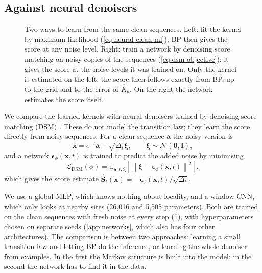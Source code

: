 \subsection{Against neural denoisers}
\label{sec:neural-denoisers}

\begin{figure}[t]
  \centering
  
  \caption{Two ways to learn from the same clean sequences. Left: fit the kernel by maximum likelihood
  (\cref{eq:neural-clean-ml}); BP then gives the score at any noise level. Right: train a network by denoising score
  matching on noisy copies of the sequences (\cref{eq:dsm-objective}); it gives the score at the noise levels it was
  trained on. Only the kernel is estimated on the left: the score then follows exactly from BP, up to the grid and to the
  error of $\widehat K_\theta$. On the right the network estimates the score itself.}
  \label{fig:routes}
\end{figure}

We compare the learned kernels with neural denoisers trained by denoising score matching (DSM)
\cite{hyvarinen2005estimation,vincent2011connection}. These do not model the transition law; they learn the score
directly from noisy sequences. For a clean sequence $\mathbf a$ the noisy version is
\begin{equation}
    \mathbf{x}
    =
    e^{-t}\mathbf{a}
    +
    \sqrt{\Delta_t}\boldsymbol{\xi},
    \qquad
    \boldsymbol{\xi}
    \sim
    \mathcal{N}(\mathbf{0},\mathbf{I}),
\end{equation}
and a network $\boldsymbol{\epsilon}_\phi(\mathbf{x},t)$ is trained to predict the added noise by minimising
\begin{equation}
    \mathcal{L}_{\mathrm{DSM}}(\phi)
    =
    \mathbb{E}_{\mathbf{a},t,\boldsymbol{\xi}}
    \left[
        \left\|
            \boldsymbol{\xi}
            -
            \boldsymbol{\epsilon}_\phi
            (\mathbf{x},t)
        \right\|^2
    \right],
    \label{eq:dsm-objective}
\end{equation}
which gives the score estimate $\widehat{\mathbf{S}}_t(\mathbf{x})=-\boldsymbol{\epsilon}_\phi(\mathbf{x},t)/\sqrt{\Delta_t}$.

We use a global MLP, which knows nothing about locality, and a window CNN, which only looks at nearby sites (26{,}016
and 5{,}505 parameters). Both are trained on the clean sequences with fresh noise at every step (\cref{fig:routes}),
with hyperparameters chosen on separate seeds (\cref{app:networks}, which also has four other architectures). The
comparison is between two approaches: learning a small transition law and letting BP do the inference, or learning the
whole denoiser from examples. In the first the Markov structure is built into the model; in the second the network has
to find it in the data.


